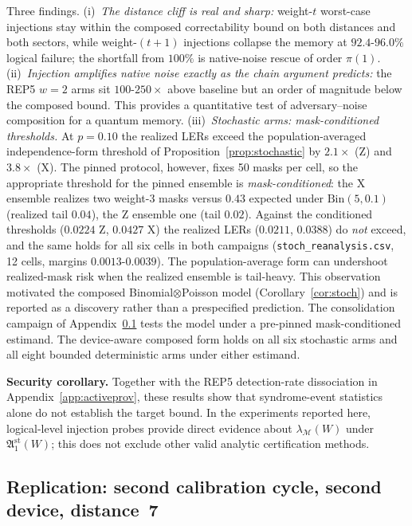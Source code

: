\documentclass[pdflatex,sn-mathphys-num]{sn-jnl}
\theoremstyle{thmstyleone}
\theoremstyle{thmstyletwo}
\theoremstyle{thmstylethree}
\begin{document}
Three findings. (i)~\emph{The distance cliff is real and sharp:} weight-$t$ worst-case injections stay within the composed correctability bound on both distances and both sectors, while weight-$(t{+}1)$ injections collapse the memory at $92.4$-$96.0\%$ logical failure; the shortfall from $100\%$ is native-noise rescue of order $\pi(1)$. (ii)~\emph{Injection amplifies native noise exactly as the chain argument predicts:} the REP5 $w{=}2$ arms sit $100$-$250\times$ above baseline but an order of magnitude below the composed bound. This provides a quantitative test of adversary--noise composition for a quantum memory. (iii)~\emph{Stochastic arms: mask-conditioned thresholds.} At $p{=}0.10$ the realized LERs exceed the population-averaged independence-form threshold of Proposition~\ref{prop:stochastic} by $2.1\times$ (Z) and $3.8\times$ (X). The pinned protocol, however, fixes 50 masks per cell, so the appropriate threshold for the pinned ensemble is \emph{mask-conditioned}: the X ensemble realizes two weight-3 masks versus $0.43$ expected under $\mathrm{Bin}(5,0.1)$ (realized tail $0.04$), the Z ensemble one (tail $0.02$). Against the conditioned thresholds ($0.0224$ Z, $0.0427$ X) the realized LERs ($0.0211$, $0.0388$) do \emph{not} exceed, and the same holds for all six cells in both campaigns (\texttt{stoch\_reanalysis.csv}, 12 cells, margins $0.0013$-$0.0039$). The population-average form can undershoot realized-mask risk when the realized ensemble is tail-heavy. This observation motivated the composed Binomial$\otimes$Poisson model (Corollary~\ref{cor:stoch}) and is reported as a discovery rather than a prespecified prediction. The consolidation campaign of Appendix~\ref{app:injection-repl} tests the model under a pre-pinned mask-conditioned estimand. The device-aware composed form holds on all six stochastic arms and all eight bounded deterministic arms under either estimand.

\noindent\textbf{Security corollary.}
Together with the REP5 detection-rate dissociation in Appendix~\ref{app:activeprov}, these results show that syndrome-event statistics alone do not establish the target bound. In the experiments reported here, logical-level injection probes provide direct evidence about $\lambda_{\mathcal{M}}(W)$ under $\mathfrak{A}_1^{\mathrm{st}}(W)$; this does not exclude other valid analytic certification methods.

\subsection{Replication: second calibration cycle, second device, distance~7}\label{app:injection-repl}
\end{document}
